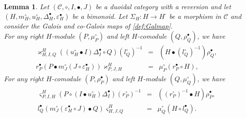 \documentclass[nosumlimits,twoside]{amsart}
\newtheorem{lemma}[lemma]{\sc Lemma}
\theoremstyle{definition}
\theoremstyle{remark}
\newcommand{\rd}[1]{{\color{red}{#1}}}
\newcommand{\Cc}{\mathcal{C}}
\begin{document}
\begin{lemma}%
Let $\left( \mathcal{C},\circ ,I,\bullet ,J\right) $ be a duoidal category
with a reversion and let $\left( H,m_{H}^{\circ },u_{H}^{\circ },\Delta
_{H}^{\bullet },\varepsilon _{H}^{\bullet }\right) $ be a bimonoid. Let $%
\Sigma _{H}:H\rightarrow H^{\text{-}}$ be a morphism in $\Cc$ and consider the Galois and co-Galois
maps of \cref{def:Galmap}.\\
For any right $H$-module $\left( P,\mu
_{P}^{\circ }\right) $ and left $H$-comodule $\left( Q,\rho _{Q}^{\bullet
}\right) $, we have%
\begin{eqnarray}
\varkappa _{H,I,Q}^{H}\left( \left( u_{H}^{\circ }\bullet I\right) \Delta
_{I}^{\bullet }\circ Q\right) \left( l_{Q}^{\circ }\right) ^{-1} &=&\left(
H\bullet \left( l_{Q}^{\circ }\right) ^{-1}\right) \rho _{Q}^{\bullet },
\label{form:Galunit} \\
r_{P}^{\bullet }\left( P\bullet m_{J}^{\circ }\left( J\circ \varepsilon
_{H}^{\bullet }\right) \right) \varkappa _{P,J,H}^{H} &=&\mu _{P}^{\circ
}\left( r_{P}^{\bullet }\circ H\right) ,  \label{form:Galcounit}\end{eqnarray}
For any right $H$-comodule $(P,\rho_P^\bullet)$ and  left $H$-module $(Q,\mu_Q^\circ)$, we have%
\begin{eqnarray}
\varsigma _{P,I,H}^{H}\left( P\circ \left( I\bullet u_{H}^{\circ }\right)
\Delta _{I}^{\bullet }\right) \left( r_{P}^{\circ }\right) ^{-1} &=&\left(
\left( r_{P}^{\circ }\right) ^{-1}\bullet H\right) \rho _{P}^{\bullet },
\label{form:coGalunit} \\
l_{Q}^{\bullet }\left( m_{J}^{\circ }\left( \varepsilon _{H}^{\bullet }\circ
J\right) \bullet Q\right) \varsigma _{H,J,Q}^{H} &=&\mu _{Q}^{\circ }\left(
H\circ l_{Q}^{\bullet }\right) .  \label{form:coGalcounit}
\end{eqnarray}
\end{lemma}
\end{document}

